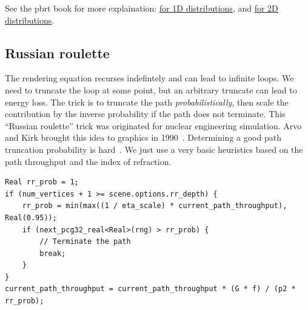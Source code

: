 See the pbrt book for more explaination: \href{https://pbr-book.org/3ed-2018/Monte_Carlo_Integration/Sampling_Random_Variables#x1-Example:Piecewise-Constant1DFunctions}{for 1D distributions}, and \href{https://www.pbr-book.org/3ed-2018/Monte_Carlo_Integration/2D_Sampling_with_Multidimensional_Transformations#Piecewise-Constant2DDistributions}{for 2D distributions}.

\subsection{Russian roulette}

The rendering equation recurses indefintely and can lead to infinite loops. We need to truncate the loop at some point, but an arbitrary truncate can lead to energy loss. The trick is to truncate the path \emph{probabilistically}, then scale the contribution by the inverse probability if the path does not terminate. This ``Russian roulette'' trick was originated for nuclear engineering simulation. Arvo and Kirk brought this idea to graphics in 1990~\cite{Arvo:1990:PTI}. Determining a good path truncation probability is hard~\cite{Vorba:2016:ARR}. We just use a very basic heuristics based on the path throughput and the index of refraction.

\begin{lstlisting}
Real rr_prob = 1;
if (num_vertices + 1 >= scene.options.rr_depth) {
    rr_prob = min(max((1 / eta_scale) * current_path_throughput), Real(0.95));
    if (next_pcg32_real<Real>(rng) > rr_prob) {
        // Terminate the path
        break;
    }
}
current_path_throughput = current_path_throughput * (G * f) / (p2 * rr_prob);
\end{lstlisting}






